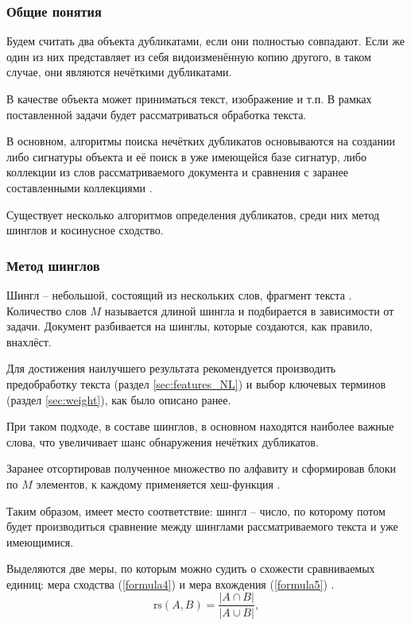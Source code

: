 \subsubsection{Общие понятия}
Будем считать два объекта дубликатами, если они полностью совпадают. Если же один из них представляет из себя видоизменённую копию другого, в таком случае, они являются нечёткими дубликатами. 

В качестве объекта может приниматься текст, изображение и т.п. В рамках поставленной задачи будет рассматриваться обработка текста. 

В основном, алгоритмы поиска нечётких дубликатов основываются на создании либо сигнатуры объекта и её поиск в уже имеющейся базе сигнатур, либо коллекции из слов рассматриваемого документа и сравнения с заранее составленными коллекциями \cite{system_development}.

Существует несколько алгоритмов определения дубликатов, среди них метод шинглов и косинусное сходство. \newline 

\subsubsection{Метод шинглов}
Шингл -- небольшой, состоящий из нескольких слов, фрагмент текста \cite{search_methods}. Количество слов $M$ называется длиной шингла и подбирается в зависимости от задачи. Документ разбивается на шинглы, которые создаются, как правило, внахлёст.

Для достижения наилучшего результата рекомендуется производить предобработку текста (раздел \ref{sec:features_NL}) и выбор ключевых терминов (раздел \ref{sec:weight}), как было описано ранее. 

При таком подходе, в составе шинглов, в основном находятся наиболее важные слова, что  увеличивает шанс обнаружения нечётких дубликатов.

Заранее отсортировав полученное множество по алфавиту и сформировав блоки по $M$ элементов, к каждому применяется хеш-функция \cite{compare}. 

Таким образом, имеет место соответствие: шингл -- число, по которому потом будет производиться сравнение между шинглами рассматриваемого текста и уже имеющимися.

Выделяются две меры, по которым можно судить о схожести сравниваемых единиц: мера сходства (\ref{formula4}) и мера вхождения (\ref{formula5}) \cite{shingle_method}.
\begin{equation}\label{formula4}
	\mbox{rs}(A, B) = \frac{\left| A \cap B \right| }{\left| A \cup B \right| },
\end{equation}

